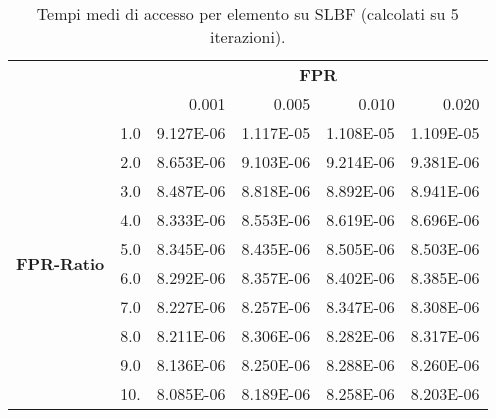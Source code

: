 \documentclass[4apaper,11pt]{report}
\begin{document}
    \begin{table}[H]
        \centering
        \begin{tabular}{llrrrr}
        \toprule
        {} & & \multicolumn{4}{c}{\textbf{FPR}}\\
        {} & &    0.001 &     0.005 &     0.010 &     0.020 \\
        \midrule
        \multirow{10}{*}{\textbf{FPR-Ratio}} &1.0 & 9.127E-06 & 1.117E-05 & 1.108E-05 & 1.109E-05 \\
        &2.0 & 8.653E-06 & 9.103E-06 & 9.214E-06 & 9.381E-06 \\
        &3.0 & 8.487E-06 & 8.818E-06 & 8.892E-06 & 8.941E-06 \\
        &4.0 & 8.333E-06 & 8.553E-06 & 8.619E-06 & 8.696E-06 \\
        &5.0 & 8.345E-06 & 8.435E-06 & 8.505E-06 & 8.503E-06 \\
        &6.0 & 8.292E-06 & 8.357E-06 & 8.402E-06 & 8.385E-06 \\
        &7.0 & 8.227E-06 & 8.257E-06 & 8.347E-06 & 8.308E-06 \\
        &8.0 & 8.211E-06 & 8.306E-06 & 8.282E-06 & 8.317E-06 \\
        &9.0 & 8.136E-06 & 8.250E-06 & 8.288E-06 & 8.260E-06 \\
        &10. & 8.085E-06 & 8.189E-06 & 8.258E-06 & 8.203E-06 \\
        \bottomrule
        \end{tabular}
        \caption{Tempi medi di accesso per elemento su SLBF (calcolati su 5 iterazioni).}
    \end{table}
\end{document}
